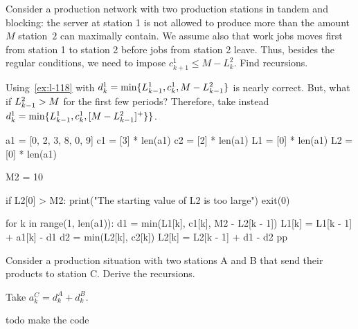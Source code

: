 \documentclass[queueing-book.tex]{subfiles}
\begin{document}
\begin{exercise}
Consider  a production network with two production stations in tandem and blocking: the server at station 1 is not allowed to produce more than the amount~$M$ station~$2$ can maximally contain.
We assume also that work jobs moves first from station 1 to station 2 before jobs from station 2 leave.
Thus, besides the regular conditions, we need to impose $c^1_{k+1} \leq M-L^2_k$.
Find recursions.

\begin{solution} Using~\cref{ex:l-118} with $d^1_k = \min\{L^1_{k-1}, c_k^1, M-L^2_{k-1}\}$ is nearly correct.
But, what if  $L^2_{k-1}>M$ for the first few periods? Therefore,  take instead
$d^1_k = \min\{L_{k-1}^1, c_k^1, [M-L^2_{k-1}]^+\}\}$.


\begin{python}
a1 = [0, 2, 3, 8, 0, 9]
c1 = [3] * len(a1)
c2 = [2] * len(a1)
L1 = [0] * len(a1)
L2 = [0] * len(a1)

M2 = 10

if L2[0] > M2:
    print("The starting value of L2 is too large")
    exit(0)

for k in range(1, len(a1)):
    d1 = min(L1[k], c1[k], M2 - L2[k - 1])
    L1[k] = L1[k - 1] + a1[k] - d1
    d2 = min(L2[k], c2[k])
    L2[k] = L2[k - 1] + d1 - d2
pp\end{python}

\end{solution}
\end{exercise}



\begin{exercise}\label{ex:l-120}
 Consider  a production situation with two stations A and B that send their products to station C.
Derive the  recursions.
\begin{solution}
Take  $a_k^C = d_{k}^A+d_{k}^B$.
\end{solution}
todo make the code

\end{exercise}
\end{document}
